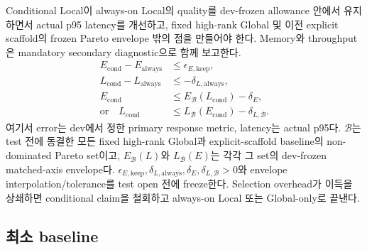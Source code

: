 \documentclass[11pt]{article}
\begin{document}
Conditional Local이 always-on Local의 quality를 dev-frozen allowance 안에서 유지하면서 actual p95 latency를
개선하고, fixed high-rank Global 및 이전 explicit scaffold의 frozen Pareto envelope 밖의 점을 만들어야 한다.
Memory와 throughput은 mandatory secondary diagnostic으로 함께 보고한다.
\begin{equation}
  \begin{aligned}
  E_{\mathrm{cond}}-E_{\mathrm{always}}&\le\epsilon_{E,\mathrm{keep}},\\
  L_{\mathrm{cond}}-L_{\mathrm{always}}&\le-\delta_{L,\mathrm{always}},\\
  E_{\mathrm{cond}}&\le E_{\mathcal B}(L_{\mathrm{cond}})-\delta_E,\\
  \text{or}\quad L_{\mathrm{cond}}&\le L_{\mathcal B}(E_{\mathrm{cond}})-\delta_{L,\mathcal B}.
  \end{aligned}
  \label{eq:rd-pareto-gate}
\end{equation}
여기서 error는 dev에서 정한 primary response metric, latency는 actual p95다.
\(\mathcal B\)는 test 전에 동결한 모든 fixed high-rank Global과 explicit-scaffold baseline의 non-dominated
Pareto set이고, \(E_{\mathcal B}(L)\)와 \(L_{\mathcal B}(E)\)는 각각 그 set의 dev-frozen matched-axis envelope다.
\(\epsilon_{E,\mathrm{keep}},\delta_{L,\mathrm{always}},\delta_E,\delta_{L,\mathcal B}>0\)와
envelope interpolation/tolerance를 test open 전에 freeze한다.
Selection overhead가 이득을 상쇄하면 conditional claim을 철회하고 always-on Local 또는 Global-only로 끝낸다.

\subsection{최소 baseline}
\end{document}
